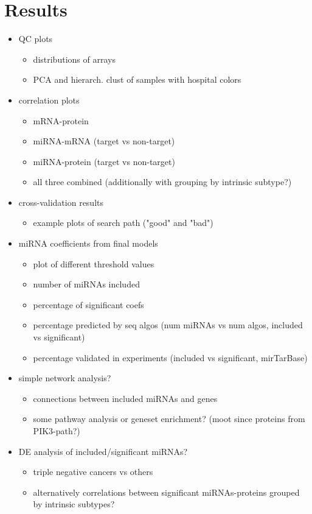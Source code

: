 
\section{Results}

\begin{itemize}
  \item QC plots
  \begin{itemize}
    \item distributions of arrays
    \item PCA and hierarch. clust of samples with hospital colors
  \end{itemize}
  \item correlation plots
  \begin{itemize}
    \item mRNA-protein
    \item miRNA-mRNA (target vs non-target)
    \item miRNA-protein (target vs non-target)
    \item all three combined (additionally with grouping by intrinsic subtype?)
  \end{itemize}
  \item cross-validation results
  \begin{itemize}
    \item example plots of search path ("good" and "bad")
  \end{itemize}
  \item miRNA coefficients from final models
  \begin{itemize}
  	\item plot of different threshold values
    \item number of miRNAs included
    \item percentage of significant coefs
    \item percentage predicted by seq algos (num miRNAs vs num algos, included vs significant)
    \item percentage validated in experiments (included vs significant, mirTarBase)
  \end{itemize}
  \item simple network analysis?
  \begin{itemize}
    \item connections between included miRNAs and genes
    \item some pathway analysis or geneset enrichment? (moot since proteins from PIK3-path?)
  \end{itemize}
  \item DE analysis of included/significant miRNAs?
  \begin{itemize}
    \item triple negative cancers vs others
    \item alternatively correlations between significant miRNAs-proteins grouped by intrinsic subtypes?
  \end{itemize}

\end{itemize}

\begin{center}
  
\end{center}
